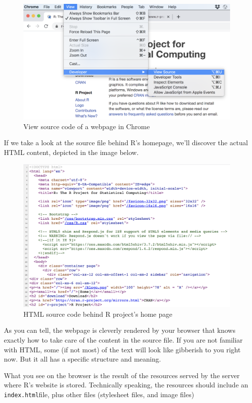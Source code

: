 \documentclass[
]{book}
\begin{document}
\begin{figure}

{\centering \includegraphics[width=0.75\linewidth]{images/html/r-webpage3} 

}

\caption{View source code of a webpage in Chrome}\label{fig:unnamed-chunk-74}
\end{figure}

If we take a look at the source file behind R's homepage, we'll discover the
actual HTML content, depicted in the image below.

\begin{figure}

{\centering \includegraphics[width=0.75\linewidth]{images/html/r-webpage-source1} 

}

\caption{HTML source code behind R project's home page}\label{fig:unnamed-chunk-75}
\end{figure}

As you can tell, the webpage is cleverly rendered by your browser that knows
exactly how to take care of the content in the source file. If you are not
familiar with HTML, some (if not most) of the text will look like gibberish to
you right now. But it all has a specific structure and meaning.

What you see on the browser is the result of the resources served by the server
where R's website is stored. Technically speaking, the resources should include
an \texttt{index.html}file, plus other files (stylesheet files, and image files)
\end{document}
